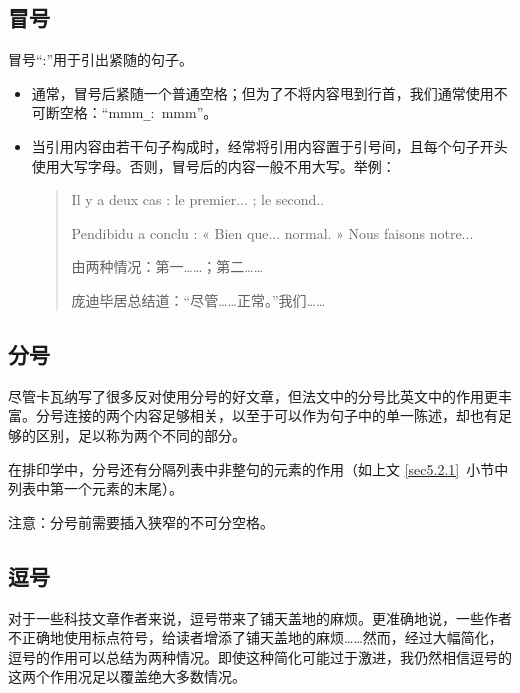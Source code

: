 \subsection{冒号}

冒号``:''用于引出紧随的句子。

\begin{itemize}
    \item 通常，冒号后紧随一个普通空格；但为了不将内容甩到行首，我们通常使用不可断空格：``mmm\verb|_|:\verb*+ +mmm''。
    \item 当引用内容由若干句子构成时，经常将引用内容置于引号间，且每个句子开头使用大写字母。否则，冒号后的内容一般不用大写。举例：
    
    \begin{quote}
        Il y a deux cas : le premier... ; le second..
        
        Pendibidu a conclu : « Bien que... normal. » Nous faisons notre...

        \begin{bil}
            由两种情况：第一……；第二……

            庞迪毕居总结道：``尽管……正常。''我们……
        \end{bil}
    \end{quote}
\end{itemize}

\subsection{分号}

尽管卡瓦纳写了很多反对使用分号的好文章，但法文中的分号比英文中的作用更丰富。分号连接的两个内容足够相关，以至于可以作为句子中的单一陈述，却也有足够的区别，足以称为两个不同的部分。

在排印学中，分号还有分隔列表中非整句的元素的作用（如上文 \ref{sec5.2.1}~小节中列表中第一个元素的末尾）。

注意：分号前需要插入狭窄的不可分空格。

\subsection{逗号}\label{sec5.2.4}

对于一些科技文章作者来说，逗号带来了铺天盖地的麻烦。更准确地说，一些作者不正确地使用标点符号，给读者增添了铺天盖地的麻烦……然而，经过大幅简化，逗号的作用可以总结为两种情况。即使这种简化可能过于激进，我仍然相信逗号的这两个作用况足以覆盖绝大多数情况。

